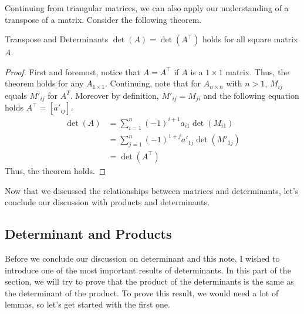 \documentclass[../../../main.tex]{subfiles}
\begin{document}
Continuing from triangular matrices, we can also apply our
understanding of a transpose of a matrix. Consider the following
theorem.

\begin{theorem}{}{Transpose and Determinants}
$\det(A) = \det(A^\intercal)$ holds for all square matrix $A$.
\end{theorem}
\begin{proof}
First and foremost, notice that $A = A^\intercal$ if $A$ is a
$1 \times 1$ matrix. Thus, the theorem holds for any $A_{1 \times 1}$.
Continuing, note that for $A_{n \times n}$ with $n > 1$, $M_{ij}$
equals $M'_{ij}$ for $A^T$. Moreover by definition, $M'_{ij} =
M_{ji}$ and the following equation holds $A^\intercal = [a'_{ij}]$.
\begin{align*}
    \det(A)
    &= \sum_{i=1}^n (-1)^{i + 1} a_{i1} \det(M_{i1}) \\
    &= \sum_{j=1}^n (-1)^{1 + j} a'_{1j} \det(M'_{1j}) \\
    &= \det\left( A^\intercal \right)
\end{align*}
Thus, the theorem holds.
\end{proof}

Now that we discussed the relationships between matrices and
determinants, let's conclude our discussion with products and
determinants.

\subsection{Determinant and Products}

Before we conclude our discussion on determinant and this note,
I wished to introduce one of the most important results of
determinants. In this part of the section, we will try to prove
that the product of the determinants is the same as the determinant
of the product. To prove this result, we would need a lot of lemmas,
so let's get started with the first one.
\end{document}
